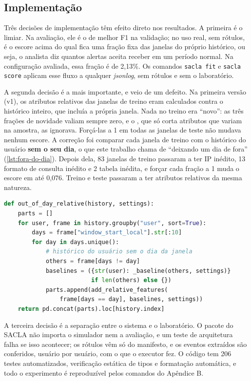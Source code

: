 \subsection{Implementação}
\label{sec:implementacao}

Três decisões de implementação têm efeito direto nos resultados. A primeira é o limiar. Na
avaliação, ele é o de melhor F1 na validação; no uso real, sem rótulos, é o escore acima do qual
fica uma fração fixa das janelas do próprio histórico, ou seja, o analista diz quantos alertas
aceita receber em um período normal. Na configuração avaliada, essa fração é de 2,13\%. Os
comandos \texttt{sacla fit} e \texttt{sacla score} aplicam esse fluxo a qualquer
\textit{jsonlog}, sem rótulos e sem o laboratório.

A segunda decisão é a mais importante, e veio de um defeito. Na primeira versão (v1), os
atributos relativos das janelas de treino eram calculados contra o histórico inteiro, que
incluía a própria janela. Nada no treino era ``novo'': as três frações de novidade valiam sempre
zero, e o \iforest{}, que só corta atributos que variam na amostra, as ignorava. Forçá-las a 1
em todas as janelas de teste não mudava nenhum escore. A correção foi comparar cada janela de
treino com o histórico do usuário \textbf{sem o seu dia}, o que este trabalho chama de
``deixando um dia de fora'' (\autoref{lst:fora-do-dia}). Depois dela, 83 janelas de treino
passaram a ter IP inédito, 13 formato de consulta inédito e 2 tabela inédita, e forçar cada
fração a 1 muda o escore em até 0,076. Treino e teste passaram a ter atributos relativos da
mesma natureza.

\begin{lstlisting}[language=Python, caption={Atributos relativos das janelas de treino, deixando um dia de fora}, label={lst:fora-do-dia}]
def out_of_day_relative(history, settings):
    parts = []
    for user, frame in history.groupby("user", sort=True):
        days = frame["window_start_local"].str[:10]
        for day in days.unique():
            # histórico do usuário sem o dia da janela
            others = frame[days != day]
            baselines = ({str(user): _baseline(others, settings)}
                         if len(others) else {})
            parts.append(add_relative_features(
                frame[days == day], baselines, settings))
    return pd.concat(parts).loc[history.index]
\end{lstlisting}

A terceira decisão é a separação entre o sistema e o laboratório. O pacote do SACLA não importa o
simulador nem a avaliação, e um teste de arquitetura falha se isso acontecer; os rótulos vêm só
do manifesto, e os eventos extraídos são conferidos, usuário por usuário, com o que o executor
fez. O código tem 206 testes automatizados, verificação estática de tipos e formatação
automática, e todo o experimento é reproduzível pelos comandos do Apêndice B.

